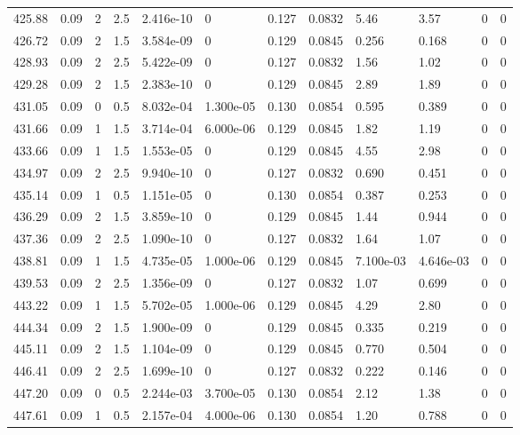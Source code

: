 \documentclass[preview]{standalone}
\begin{document}
{{{{{{{\begin{tabular}{L{1.2cm}C{1.2cm} C{0.3cm}C{0.5cm} C{1.4cm}C{1.4cm} C{1.4cm}C{1.4cm} C{1.6cm}C{1.6cm} C{1.6cm}C{1.6cm}}
  425.88  &  0.09  & 2     & 2.5 &  2.416e-10  & 0  &  0.127&   0.0832& 5.46 & 3.57   &  0 & 0  \\ 
  426.72  &  0.09  & 2     & 1.5 &  3.584e-09  & 0  &  0.129&   0.0845& 0.256 & 0.168   &  0 & 0  \\ 
  428.93  &  0.09  & 2     & 2.5 &  5.422e-09  & 0  &  0.127&   0.0832& 1.56 & 1.02   &  0 & 0  \\ 
  429.28  &  0.09  & 2     & 1.5 &  2.383e-10  & 0  &  0.129&   0.0845& 2.89 & 1.89   &  0 & 0  \\ 
  431.05  &  0.09  & 0     & 0.5 &  8.032e-04  & 1.300e-05  &  0.130&   0.0854& 0.595 & 0.389   &  0 & 0  \\ 
  431.66  &  0.09  & 1     & 1.5 &  3.714e-04  & 6.000e-06  &  0.129&   0.0845& 1.82 & 1.19   &  0 & 0  \\ 
  433.66  &  0.09  & 1     & 1.5 &  1.553e-05  & 0  &  0.129&   0.0845& 4.55 & 2.98   &  0 & 0  \\ 
  434.97  &  0.09  & 2     & 2.5 &  9.940e-10  & 0  &  0.127&   0.0832& 0.690 & 0.451   &  0 & 0  \\ 
  435.14  &  0.09  & 1     & 0.5 &  1.151e-05  & 0  &  0.130&   0.0854& 0.387 & 0.253   &  0 & 0  \\ 
  436.29  &  0.09  & 2     & 1.5 &  3.859e-10  & 0  &  0.129&   0.0845& 1.44 & 0.944   &  0 & 0  \\ 
  437.36  &  0.09  & 2     & 2.5 &  1.090e-10  & 0  &  0.127&   0.0832& 1.64 & 1.07   &  0 & 0  \\ 
  438.81  &  0.09  & 1     & 1.5 &  4.735e-05  & 1.000e-06  &  0.129&   0.0845& 7.100e-03 & 4.646e-03   &  0 & 0  \\ 
  439.53  &  0.09  & 2     & 2.5 &  1.356e-09  & 0  &  0.127&   0.0832& 1.07 & 0.699   &  0 & 0  \\ 
  443.22  &  0.09  & 1     & 1.5 &  5.702e-05  & 1.000e-06  &  0.129&   0.0845& 4.29 & 2.80   &  0 & 0  \\ 
  444.34  &  0.09  & 2     & 1.5 &  1.900e-09  & 0  &  0.129&   0.0845& 0.335 & 0.219   &  0 & 0  \\ 
  445.11  &  0.09  & 2     & 1.5 &  1.104e-09  & 0  &  0.129&   0.0845& 0.770 & 0.504   &  0 & 0  \\ 
  446.41  &  0.09  & 2     & 2.5 &  1.699e-10  & 0  &  0.127&   0.0832& 0.222 & 0.146   &  0 & 0  \\ 
  447.20  &  0.09  & 0     & 0.5 &  2.244e-03  & 3.700e-05  &  0.130&   0.0854& 2.12 & 1.38   &  0 & 0  \\ 
  447.61  &  0.09  & 1     & 0.5 &  2.157e-04  & 4.000e-06  &  0.130&   0.0854& 1.20 & 0.788   &  0 & 0  \\ 

\end{tabular}}}}}}}}
\end{document}
